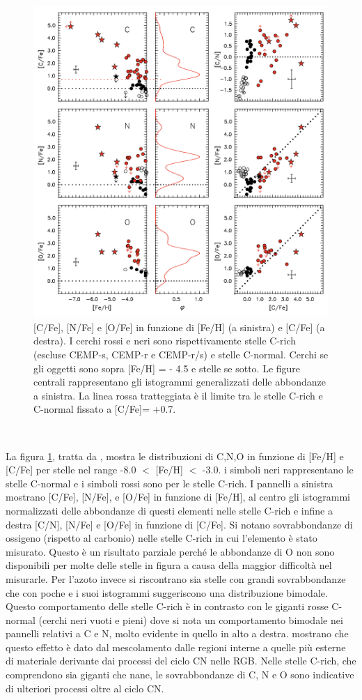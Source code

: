 \documentclass[12pt]{article}
\begin{document}
\begin{figure}[htp!]
\center
  \includegraphics[width=0.8 \textwidth]{cno}
  \caption{[C/Fe], [N/Fe] e [O/Fe] in funzione di [Fe/H] (a sinistra) e [C/Fe] (a destra). I cerchi rossi e neri sono rispettivamente stelle  C-rich (escluse CEMP-s, CEMP-r e CEMP-r/s) e stelle C-normal. Cerchi se gli oggetti sono sopra [Fe/H] = - 4.5 e stelle se sotto. Le figure centrali rappresentano gli istogrammi generalizzati delle abbondanze a sinistra.  La linea rossa tratteggiata è il limite tra le stelle C-rich e C-normal fissato a [C/Fe]= +0.7.
 }
  \label{cno}
 \end{figure}
\



La figura \ref{cno}, tratta da \cite{principale}, mostra le distribuzioni di C,N,O in funzione di [Fe/H] e [C/Fe] per stelle nel range -8.0 $<$ [Fe/H] $<$ -3.0. i simboli neri rappresentano le stelle C-normal e i simboli rossi sono per le stelle C-rich.
I pannelli a sinistra mostrano [C/Fe], [N/Fe], e [O/Fe] in funzione di [Fe/H], al centro gli istogrammi normalizzati delle abbondanze di questi elementi nelle stelle C-rich e infine a destra [C/N], [N/Fe] e [O/Fe] in funzione di [C/Fe].
Si notano sovrabbondanze di ossigeno (rispetto al carbonio) nelle stelle C-rich in cui l’elemento è stato misurato. Questo è un risultato parziale perché le abbondanze di O non sono disponibili per molte delle stelle in figura a causa della maggior difficoltà nel misurarle. Per l’azoto invece si riscontrano sia stelle con grandi sovrabbondanze che con poche e i suoi istogrammi suggeriscono una distribuzione bimodale. 
Questo comportamento delle stelle C-rich è in contrasto con le giganti rosse C-normal (cerchi neri vuoti e pieni) dove si nota un comportamento bimodale nei pannelli relativi a C e N, molto evidente in quello in alto a destra. \cite{spite} mostrano che questo effetto è dato dal mescolamento dalle regioni interne a quelle più esterne di materiale derivante dai processi del ciclo CN nelle RGB.
Nelle stelle C-rich, che comprendono sia giganti che nane, le sovrabbondanze di C, N e O sono indicative di ulteriori processi oltre al ciclo CN. 
\end{document}
